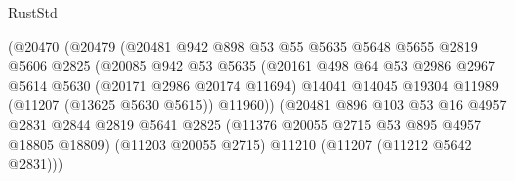 \begin{lexlean}{RustStd}
\begin{coremodule}
                                        (@20470
                                          (@20479
                                            (@20481
                                              @942
                                              @898
                                              @53
                                              @55
                                              @5635
                                              @5648
                                              @5655
                                              @2819
                                              @5606
                                              @2825
                                              (@20085
                                                @942
                                                @53
                                                @5635
                                                (@20161
                                                  @498
                                                  @64
                                                  @53
                                                  @2986
                                                  @2967
                                                  @5614
                                                  @5630
                                                  (@20171 @2986 @20174 @11694)
                                                  @14041
                                                  @14045
                                                  @19304
                                                  @11989
                                                  (@11207 (@13625 @5630 @5615))
                                                  @11960))
                                              (@20481
                                                @896
                                                @103
                                                @53
                                                @16
                                                @4957
                                                @2831
                                                @2844
                                                @2819
                                                @5641
                                                @2825
                                                (@11376 @20055 @2715 @53 @895 @4957 @18805 @18809)
                                                (@11203 @20055 @2715)
                                                @11210
                                                (@11207 (@11212 @5642 @2831)))

\end{coremodule}
\end{lexlean}
